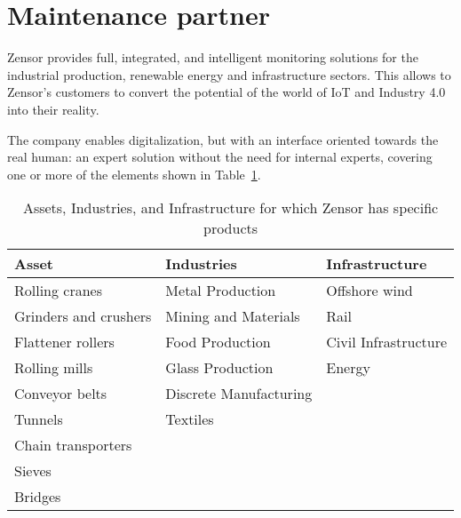 \section{Maintenance partner}
Zensor \cite{Misc:zensor_official_website} provides full, integrated, and intelligent monitoring solutions for the industrial production, renewable energy and infrastructure sectors.
This allows to Zensor's customers to convert the potential of  the world of \ac{IoT} and Industry 4.0 into their reality. 

The company enables digitalization, but with an interface oriented towards the real human: an expert solution without the need for internal experts, covering one or more of the elements shown in Table~\ref{tab:assets_zensors}.
\begin{table}[ht]
    \begin{tabularx}{\textwidth}{l l l}
        \toprule
        Asset                 & Industries             & Infrastructure       \\ \midrule
        Rolling cranes        & Metal Production       & Offshore wind        \\
        Grinders and crushers & Mining and Materials   & Rail                 \\
        Flattener rollers     & Food Production        & Civil Infrastructure \\
        Rolling mills         & Glass Production       & Energy               \\
        Conveyor belts        & Discrete Manufacturing                        \\
        Tunnels               & Textiles                                      \\
        Chain transporters    &                                               \\
        Sieves                &                                               \\
        Bridges               &                                               \\ \bottomrule
    \end{tabularx}
    \caption{Assets, Industries, and Infrastructure for which Zensor has specific products}
    \label{tab:assets_zensors}
\end{table}

